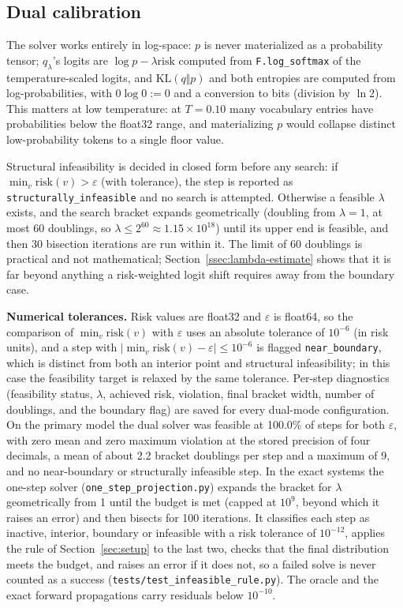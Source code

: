 \documentclass[make,article,submit,pdftex]{Definitions/mdpi}
\providecommand{\KL}{}\renewcommand{\KL}{\mathrm{KL}}
\newcommand{\risk}{\mathrm{risk}}
\begin{document}
\subsection{Dual calibration}
\label{ssec:dual-fix}
The solver works entirely in log-space: $p$ is never materialized as a probability tensor; $q_\lambda$'s logits are $\log p-\lambda\risk$ computed from \texttt{F.log\_\allowbreak{}softmax} of the temperature-scaled logits, and $\KL(q\Vert p)$ and both entropies are computed from log-probabilities, with $0\log0:=0$ and a conversion to bits (division by $\ln2$). This matters at low temperature: at $T{=}0.10$ many vocabulary entries have probabilities below the float32 range, and materializing $p$ would collapse distinct low-probability tokens to a single floor value.

Structural infeasibility is decided in closed form before any search: if $\min_v\risk(v)>\varepsilon$ (with tolerance), the step is reported as \texttt{structurally\_\allowbreak{}infeasible} and no search is attempted. Otherwise a feasible $\lambda$ exists, and the search bracket expands geometrically (doubling from $\lambda{=}1$, at most 60 doublings, so $\lambda\le2^{60}\approx1.15\times10^{18}$) until its upper end is feasible, and then 30 bisection iterations are run within it. The limit of 60 doublings is practical and not mathematical; Section~\ref{ssec:lambda-estimate} shows that it is far beyond anything a risk-weighted logit shift requires away from the boundary case.

\textbf{Numerical tolerances.} Risk values are float32 and $\varepsilon$ is float64, so the comparison of $\min_v\risk(v)$ with $\varepsilon$ uses an absolute tolerance of $10^{-6}$ (in risk units), and a step with $|\min_v\risk(v)-\varepsilon|\le10^{-6}$ is flagged \texttt{near\_\allowbreak{}boundary}, which is distinct from both an interior point and structural infeasibility; in this case the feasibility target is relaxed by the same tolerance. Per-step diagnostics (feasibility status, $\lambda$, achieved risk, violation, final bracket width, number of doublings, and the boundary flag) are saved for every dual-mode configuration. On the primary model the dual solver was feasible at 100.0\% of steps for both $\varepsilon$, with zero mean and zero maximum violation at the stored precision of four decimals, a mean of about 2.2 bracket doublings per step and a maximum of 9, and no near-boundary or structurally infeasible step. In the exact systems the one-step solver (\texttt{one\_\allowbreak{}step\_\allowbreak{}projection.py}) expands the bracket for $\lambda$ geometrically from 1 until the budget is met (capped at $10^{9}$, beyond which it raises an error) and then bisects for 100 iterations. It classifies each step as inactive, interior, boundary or infeasible with a risk tolerance of $10^{-12}$, applies the rule of Section~\ref{sec:setup} to the last two, checks that the final distribution meets the budget, and raises an error if it does not, so a failed solve is never counted as a success (\texttt{tests/test\_\allowbreak{}infeasible\_\allowbreak{}rule.py}). The oracle and the exact forward propagations carry residuals below $10^{-10}$.
\end{document}
